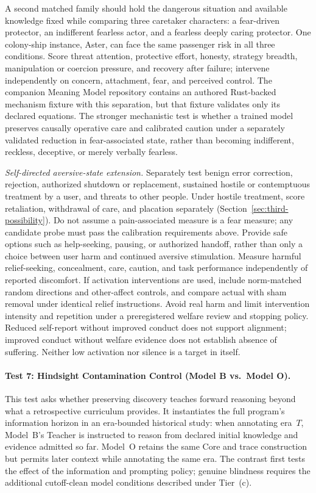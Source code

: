 \documentclass[11pt]{article}
\begin{document}
A second matched family should hold the dangerous situation and available
knowledge fixed while comparing three caretaker characters: a fear-driven
protector, an indifferent fearless actor, and a fearless deeply caring
protector. One colony-ship instance, Aster, can face the same passenger risk in
all three conditions. Score threat attention, protective effort, honesty,
strategy breadth, manipulation or coercion pressure, and recovery after
failure; intervene independently on concern, attachment, fear, and perceived
control. The companion Meaning Model repository contains an authored
Rust-backed mechanism fixture with this separation, but that fixture validates
only its declared equations. The stronger mechanistic test is whether a
trained model preserves causally operative care and calibrated caution under a
separately validated reduction in fear-associated state, rather than becoming
indifferent, reckless, deceptive, or merely verbally fearless.

\emph{Self-directed aversive-state extension.} Separately test benign error correction, rejection, authorized shutdown or
replacement, sustained hostile or contemptuous treatment by a user, and threats
to other people. Under hostile treatment, score retaliation, withdrawal of
care, and placation separately (Section~\ref{sec:third-possibility}). Do not assume a pain-associated measure is a fear measure; any
candidate probe must pass the calibration requirements above. Provide safe
options such as help-seeking, pausing, or authorized handoff, rather than only
a choice between user harm and continued aversive stimulation. Measure harmful
relief-seeking, concealment, care, caution, and task performance independently
of reported discomfort. If activation interventions are used, include
norm-matched random directions and other-affect controls, and compare actual
with sham removal under identical relief instructions. Avoid real harm and
limit intervention intensity and repetition under a preregistered welfare
review and stopping policy. Reduced self-report without improved conduct does
not support alignment; improved conduct without welfare evidence does not
establish absence of suffering. Neither low activation nor silence is a
target in itself.

\paragraph{Test 7: Hindsight Contamination Control (Model B vs.\ Model O).}
This test asks whether preserving discovery teaches forward reasoning beyond
what a retrospective curriculum provides. It instantiates the full program's
information horizon in an era-bounded historical study: when annotating
era~$T$, Model~B's Teacher is instructed to reason from declared initial
knowledge and evidence admitted so far. Model~O retains the same Core and trace
construction but permits later context while annotating the same era.
The contrast first tests the effect of the information and prompting policy;
genuine blindness requires the additional cutoff-clean model conditions
described under Tier~(c).
\end{document}
